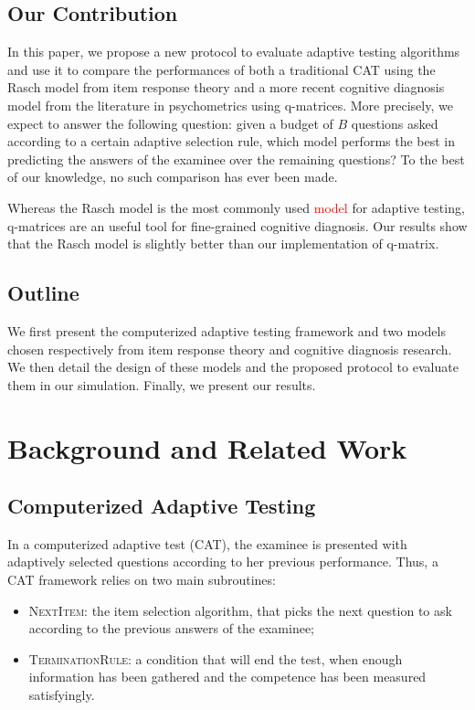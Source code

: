 \documentclass{sig-alternate}
\newcommand\alert[1]{\textcolor{red}{#1}}
\begin{document}
\subsection{Our Contribution}

In this paper, we propose a new protocol to evaluate adaptive testing algorithms and use it to compare the performances of both a traditional CAT using the Rasch model from item response theory and a more recent cognitive diagnosis model from the literature in psychometrics using q-matrices. More precisely, we expect to answer the following question: given a budget of $B$ questions asked according to a certain adaptive selection rule, which model performs the best in predicting the answers of the examinee over the remaining questions? To the best of our knowledge, no such comparison has ever been made.

Whereas the Rasch model is the most commonly used \alert{model} for adaptive testing, q-matrices are an useful tool for fine-grained cognitive diagnosis. Our results show that the Rasch model is slightly better than our implementation of q-matrix.

\subsection{Outline}

We first present the computerized adaptive testing framework and two models chosen respectively from item response theory and cognitive diagnosis research. We then detail the design of these models and the proposed protocol to evaluate them in our simulation. Finally, we present our results.

\section{Background and Related Work}

\subsection{Computerized Adaptive Testing}

In a computerized adaptive test (CAT), the examinee is presented with adaptively selected questions according to her previous performance. Thus, a CAT framework relies on two main subroutines:
\begin{itemize}
\item \textsc{NextItem}: the item selection algorithm, that picks the next question to ask according to the previous answers of the examinee;
\item \textsc{TerminationRule}: a condition that will end the test, when enough information has been gathered and the competence has been measured satisfyingly.
\end{itemize}
\end{document}
